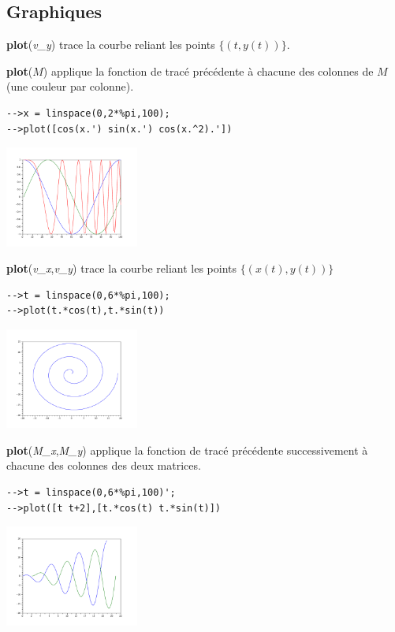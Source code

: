 \documentclass{article}
\begin{document}
\begin{multicols}{3}
\section*{Graphiques}
\begin{description}
\item{\textbf{plot}(\textit{v\_y})}  trace la courbe reliant les points $\{(t,y(t))\}$.
\item{\textbf{plot}($M$)}  applique la fonction de tracé précédente à chacune des colonnes de $M$ (une couleur par colonne).
\begin{verbatim}
-->x = linspace(0,2*%pi,100);
-->plot([cos(x.') sin(x.') cos(x.^2).'])
\end{verbatim}
\includegraphics[width=0.33\textwidth]{images/plotmat.pdf}
\item{\textbf{plot}(\textit{v\_x},\textit{v\_y})}  trace la courbe reliant les points $\{(x(t),y(t))\}$
\begin{verbatim}
-->t = linspace(0,6*%pi,100);
-->plot(t.*cos(t),t.*sin(t))
\end{verbatim}
\includegraphics[width=0.33\textwidth]{images/snail.pdf}
\item{\textbf{plot}(\textit{M\_x},\textit{M\_y})}  applique la fonction de tracé précédente successivement à chacune des colonnes des deux matrices.
\begin{verbatim}
-->t = linspace(0,6*%pi,100)';
-->plot([t t+2],[t.*cos(t) t.*sin(t)])
\end{verbatim}
\includegraphics[width=0.33\textwidth]{images/plotmat2.pdf}

\end{description}
\end{multicols}
\end{document}
